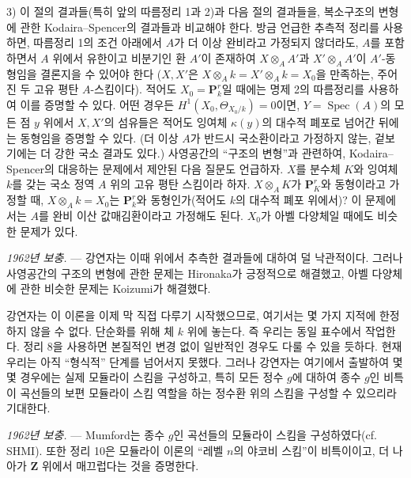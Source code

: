 3) 이 절의 결과들(특히 앞의 따름정리 1과 2)과 다음 절의 결과들을,
복소구조의 변형에 관한 Kodaira--Spencer의 결과들과 비교해야 한다.
방금 언급한 추측적 정리를 사용하면, 따름정리 1의 조건 아래에서
$A$가 더 이상 완비라고 가정되지 않더라도, $A$를 포함하면서
$A$ 위에서 유한이고 비분기인 환 $A'$이 존재하여
$X\otimes_A A'$과 $X'\otimes_A A'$이 $A'$-동형임을 결론지을 수 있어야 한다
($X,X'$은 $X\otimes_A k=X'\otimes_A k=X_0$을 만족하는, 주어진 두
고유 평탄 $A$-스킴이다). 적어도
$X_0=\mathbf P_k^r$일 때에는 명제 2의 따름정리를 사용하여 이를 증명할 수 있다. 어떤
경우든 $H^1(X_0,\Theta_{X_0/k})=0$이면, $Y=\operatorname{Spec}(A)$의
모든 점 $y$ 위에서 $X,X'$의 섬유들은
적어도 잉여체 $\kappa(y)$의 대수적 폐포로 넘어간 뒤에는 동형임을 증명할 수 있다.
(더 이상 $A$가 반드시 국소환이라고 가정하지 않는, 겉보기에는
더 강한 국소 결과도 있다.) 사영공간의 ``구조의 변형''과 관련하여,
Kodaira--Spencer의 대응하는 문제에서 제안된 다음 질문도 언급하자. $X$를
분수체 $K$와 잉여체 $k$를 갖는 국소 정역 $A$ 위의
고유 평탄 스킴이라 하자. $X\otimes_A K$가
$\mathbf P_K^r$와 동형이라고 가정할 때, $X\otimes_A k=X_0$는
$\mathbf P_k^r$와 동형인가(적어도 $k$의 대수적 폐포 위에서)? 이 문제에서는
$A$를 완비 이산 값매김환이라고 가정해도 된다. $X_0$가
아벨 다양체일 때에도 비슷한 문제가 있다.

\emph{1962년 보충.} --- 강연자는 이때 위에서 추측한 결과들에 대하여
덜 낙관적이다. 그러나 사영공간의 구조의 변형에 관한 문제는 Hironaka가
긍정적으로 해결했고, 아벨 다양체에 관한 비슷한 문제는 Koizumi가 해결했다.

강연자는 이 이론을 이제 막 직접 다루기 시작했으므로, 여기서는 몇 가지
지적에 한정하지 않을 수 없다. 단순화를 위해 체 $k$ 위에 놓는다. 즉 우리는
동일 표수에서 작업한다. 정리 8을 사용하면 본질적인 변경 없이 일반적인
경우도 다룰 수 있을 듯하다. 현재 우리는 아직 ``형식적'' 단계를 넘어서지
못했다. 그러나 강연자는 여기에서 출발하여 몇몇 경우에는 실제 모듈라이
스킴을 구성하고, 특히 모든 정수 $g$에 대하여 종수 $g$인 비특이 곡선들의
보편 모듈라이 스킴 역할을 하는 정수환 위의 스킴을 구성할 수 있으리라
기대한다.

\emph{1962년 보충.} --- Mumford는 종수 $g$인 곡선들의 모듈라이 스킴을
구성하였다(cf. SHMI). 또한 정리 10은 모듈라이 이론의 ``레벨 $n$의 야코비
스킴''이 비특이이고, 더 나아가 $\mathbf Z$ 위에서 매끄럽다는 것을 증명한다.

